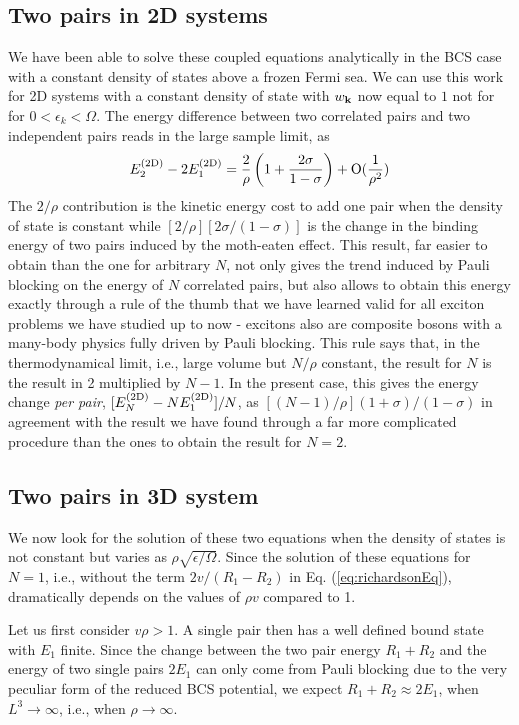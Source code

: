 \documentclass[aps,prb,showpacs,3p,twocolumn]{elsarticle}
\begin{document}
\subsection{Two pairs in 2D systems}
We have been able to solve these coupled equations analytically in the BCS case with a constant density of states above a frozen Fermi sea\cite{combescotBCS}.  We can use  this work  for 2D systems with a constant density of state with $w_{\mathbf{k}}$ now equal to $1$ not for  for $0<\epsilon_k<\Omega$. The energy difference between two correlated pairs and two independent pairs reads in the large sample limit, as 
\begin{equation}
E^{{{\text{(2D)}}}}_2-2E_1^{{{\text{(2D)}}}}=\frac{2}{\rho}\left(1+\frac{2\sigma}{1-\sigma}\right)+\text{O}(\frac{1}{\rho^2})
\label{eq:}
\end{equation}
The $2/\rho$ contribution is the kinetic energy cost to add one pair when the density of state is constant while $[2/\rho][2\sigma/(1-\sigma)]$ is the change in the binding energy of two pairs induced by the moth-eaten effect. This result, far easier to obtain than the one for arbitrary $N$, not only gives the trend induced by Pauli blocking on the energy of $N$ correlated pairs, but also allows to obtain this energy exactly through a rule of the thumb that we have learned valid for all exciton problems we have studied up to now - excitons also are composite bosons with a many-body physics fully driven by Pauli blocking.  This rule says that, in the thermodynamical limit, i.e., large volume but $N/\rho$ constant, the result for $N$ is the result in 2 multiplied by $N-1$.  In the present case, this gives the energy change \emph{per pair}, $[E^{{{\text{(2D)}}}}_N-NE^{{{\text{(2D)}}}}_1]/N$, as $[(N-1)/\rho](1+\sigma)/(1-\sigma)$ in agreement with the result we have found through a far more complicated procedure than the ones to obtain the result for $N=2$.

\subsection{Two pairs in 3D system}
We now look for the solution of these two equations when the density of states is not constant but varies as $\rho\sqrt{\epsilon/\Omega}$.  Since the solution of these equations for $N=1$, i.e., without the term $2v/(R_1-R_2)$  in Eq. (\ref{eq:richardsonEq}), dramatically depends on the values of $\rho{}v$ compared to 1.

Let us first consider  $v\rho>1$.  A single pair then has a well defined bound state with $E_1$  finite. Since the change between the two pair energy $R_{1}+R_{2}$ and the energy of two single pairs  $2E_{1}$ can only come from Pauli blocking due to the very peculiar form of the reduced BCS potential, we expect $R_1+R_2\approx2E_1$, when $L^3\rightarrow\infty$, i.e., when $\rho\rightarrow\infty$. 
\end{document}
